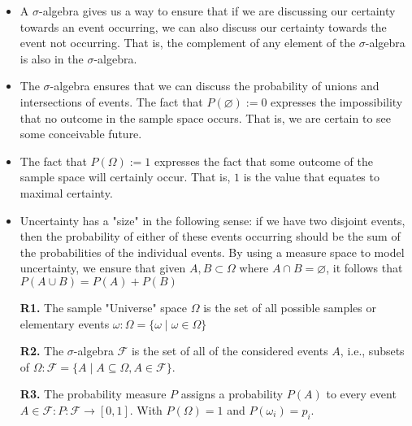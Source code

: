 	\begin{itemize}
		\item A $\sigma$-algebra gives us a way to ensure that if we are discussing our certainty towards an event occurring, we can also discuss our certainty towards the event not occurring. That is, the complement of any element of the $\sigma$-algebra is also in the $\sigma$-algebra.
		
		\item The $\sigma$-algebra ensures that we can discuss the probability of unions and intersections of events. The fact that $P(\varnothing):=0$ expresses the impossibility that no outcome in the sample space occurs. That is, we are certain to see some conceivable future.
		
		\item The fact that $P(\Omega):=1$ expresses the fact that some outcome of the sample space will certainly occur. That is, $1$ is the value that equates to maximal certainty.
		
		\item Uncertainty has a "size" in the following sense: if we have two disjoint events, then the probability of either of these events occurring should be the sum of the probabilities of the individual events. By using a measure space to model uncertainty, we ensure that given $A, B \subset \Omega$ where $A \cap B=\varnothing$, it follows that $P(A \cup B)=P(A)+P(B)$
	\end{itemize}
	\begin{tcolorbox}[enhanced,title=Remarks,colframe=black,arc=10pt,drop lifted shadow,after skip=15pt plus 2pt]
	\begin{itemize}
	\item[\textbf{R1.}] The sample "Universe" space $\Omega$ is the set of all possible samples or elementary events $\omega: \Omega=\{\omega \mid \omega \in \Omega\}$
	
	\item[\textbf{R2.}] The $\sigma$-algebra $\mathcal{F}$ is the set of all of the considered events $A$, i.e., subsets of $\Omega: \mathcal{F}=\{A \mid A \subseteq \Omega, A \in \mathcal{F}\}$.
	
	\item[\textbf{R3.}] The probability measure $P$ assigns a probability $P(A)$ to every event $A \in \mathcal{F}: P: \mathcal{F} \rightarrow[0,1]$. With $P(\Omega)=1$ and $P(\omega_i)=p_i$.
	\end{itemize}
	\end{tcolorbox}

